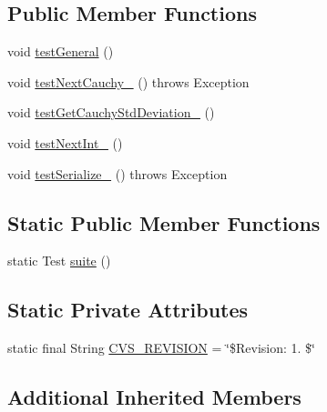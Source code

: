 \subsection*{Public Member Functions}
\begin{DoxyCompactItemize}
\item 
void \hyperlink{classorg_1_1jgap_1_1impl_1_1_cauchy_random_generator_test_abbee59e7277ce668b7765d4fcd68c902}{test\-General} ()
\item 
void \hyperlink{classorg_1_1jgap_1_1impl_1_1_cauchy_random_generator_test_aa1d18ef9636a7adf1d57582ed2f66ce8}{test\-Next\-Cauchy\-\_} ()  throws Exception 
\item 
void \hyperlink{classorg_1_1jgap_1_1impl_1_1_cauchy_random_generator_test_ab4c709e82a32f56e87ada1947a8bd21a}{test\-Get\-Cauchy\-Std\-Deviation\-\_} ()
\item 
void \hyperlink{classorg_1_1jgap_1_1impl_1_1_cauchy_random_generator_test_aeecddbf9c0574d1d322cce47eb6124f5}{test\-Next\-Int\-\_} ()
\item 
void \hyperlink{classorg_1_1jgap_1_1impl_1_1_cauchy_random_generator_test_a157a2f8e2d9d45bfd8dc63fc63cc4867}{test\-Serialize\-\_} ()  throws Exception 
\end{DoxyCompactItemize}
\subsection*{Static Public Member Functions}
\begin{DoxyCompactItemize}
\item 
static Test \hyperlink{classorg_1_1jgap_1_1impl_1_1_cauchy_random_generator_test_a6e12cb315bb90d5c3439b3d7b97d4a32}{suite} ()
\end{DoxyCompactItemize}
\subsection*{Static Private Attributes}
\begin{DoxyCompactItemize}
\item 
static final String \hyperlink{classorg_1_1jgap_1_1impl_1_1_cauchy_random_generator_test_a22237fc504630f8b03232d9775e60169}{C\-V\-S\-\_\-\-R\-E\-V\-I\-S\-I\-O\-N} = \char`\"{}\$Revision\-: 1. \$\char`\"{}
\end{DoxyCompactItemize}
\subsection*{Additional Inherited Members}



